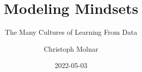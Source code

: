 \documentclass[
  10pt,
]{scrbook}
\title{Modeling Mindsets}
\subtitle{The Many Cultures of Learning From Data}
\author{Christoph Molnar}
\date{2022-05-03}
\begin{document}
\maketitle

\thispagestyle{empty}

\end{document}
